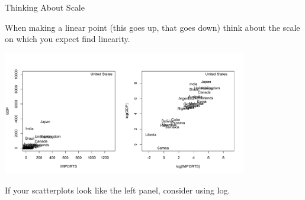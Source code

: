 \documentclass[11pt,xcolor=svgnames]{beamer}
\newcommand{\theme}{\color{Maroon}}
\newcommand{\gr}{\color{gray}}
\newcommand{\sg}{\color{DarkSlateGray}}
\newcommand{\nv}{\color{Navy}}
\newcommand{\sk}{\vspace{.5cm}}
\begin{document}


\begin{frame}
{Thinking About Scale}

\sk
When making a linear point {\gr (this goes up, that goes down)} think about the scale on which you expect find linearity.

\includegraphics[width=4.2in]{../graphs/trade}

{\sg If your scatterplots look like the left panel, consider using {\theme
    log}.}

\end{frame}
\end{document}
